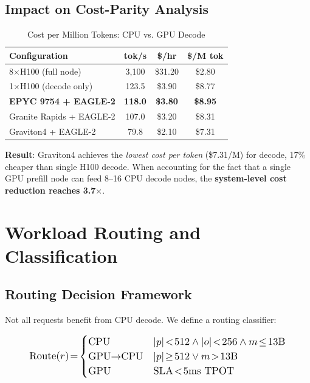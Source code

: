 \documentclass[conference,10pt]{IEEEtran}
\begin{document}
\subsection{Impact on Cost-Parity Analysis}

\begin{table}[!htbp]
\caption{Cost per Million Tokens: CPU vs. GPU Decode}
\label{tab:costparity}
\centering\footnotesize
\begin{tabular}{@{}lccc@{}}
\toprule
\textbf{Configuration} & \textbf{tok/s} & \textbf{\$/hr} & \textbf{\$/M tok} \\
\midrule
8$\times$H100 (full node) & 3,100 & \$31.20 & \$2.80 \\
1$\times$H100 (decode only) & 123.5 & \$3.90 & \$8.77 \\
\textbf{EPYC 9754 + EAGLE-2} & \textbf{118.0} & \textbf{\$3.80} & \textbf{\$8.95} \\
Granite Rapids + EAGLE-2 & 107.0 & \$3.20 & \$8.31 \\
Graviton4 + EAGLE-2 & 79.8 & \$2.10 & \$7.31 \\
\bottomrule
\end{tabular}
\end{table}

\textbf{Result}: Graviton4 achieves the \emph{lowest cost per token} (\$7.31/M) for decode, 17\% cheaper than single H100 decode. When accounting for the fact that a single GPU prefill node can feed 8--16 CPU decode nodes, the \textbf{system-level cost reduction reaches 3.7$\times$}.

\section{Workload Routing and Classification}
\label{sec:routing}

\subsection{Routing Decision Framework}

Not all requests benefit from CPU decode. We define a routing classifier:

\begin{equation}
\resizebox{0.88\linewidth}{!}{$
\text{Route}(r)\!=\!\begin{cases}
\text{CPU} & |p|\!<\!512 \wedge |o|\!<\!256 \wedge m\!\leq\!13\text{B} \\
\text{GPU}{\to}\text{CPU} & |p|\!\geq\!512 \vee m\!>\!13\text{B} \\
\text{GPU} & \text{SLA}\!<\!5\text{ms TPOT}
\end{cases}
$}
\end{equation}
\end{document}
